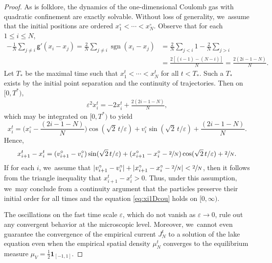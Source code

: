 \documentclass[JEP,XML,SOM,Unicode,published]{cedram}
\theoremstyle{plain}
\theoremstyle{definition}
\DeclareMathOperator{\sgn}{sgn}
\let\vep\varepsilon
\newcommand{\indic}{\mathbf{1}}
\newcommand{\g}{{\mathsf{g}}}
\begin{document}
\begin{proof}
As is folklore, the dynamics of the one-dimensional Coulomb gas with quadratic confinement are exactly solvable. Without loss of generality, we~assume that the initial positions are ordered $x_1^\circ<\cdots < x_N^\circ$. Observe that for each $1\le i\le N$,
\begin{align*}
- \frac1N\sum_{j\ne i}\g'(x_i-x_j) = \frac2N\sum_{j\neq i}\sgn(x_i-x_j) &= \frac2N\sum_{j<i} 1 - \frac2N\sum_{j>i}\\
&= \frac{2[(i-1) - (N-i)]}{N}= \frac{2(2i - 1-N)}{N}.
\end{align*}
Let $T_*$ be the maximal time such that $x_1^t<\cdots<x_N^t$ for all $t<T_*$. Such a $T_*$ exists by the initial point separation and the continuity of trajectories. Then on $[0,T^*)$,
\begin{align*}
\vep^2 \ddot{x}_i^t = - 2x_i^t + \frac{2(2i - 1-N)}{N},
\end{align*}
which may be integrated on $[0,T^*)$ to yield
\begin{equation}\label{eq:xi1Dcou}
x_i^t = \Big(x_i^\circ - \frac{(2i - 1-N)}{N}\Big)\cos(\sqrt{2}\,t/\vep) + v_i^\circ\sin(\sqrt{2}\,t/\vep) + \frac{(2i - 1-N)}{N}.
\end{equation}
Hence,
\begin{equation*}
x_{i+1}^t - x_i^t = (v_{i+1}^\circ - v_i^\circ)\sin(\sqrt{2}\,t/\vep) + (x_{i+1}^\circ-x_i^\circ - \sfrac{2}{N})\cos(\sqrt{2}\,t/\vep) + \sfrac{2}{N}.
\end{equation*}
If for each $i$, we~assume that $|v_{i+1}^\circ-v_i^\circ| + |x_{i+1}^\circ-x_i^\circ - \sfrac2N|< \sfrac2N$, then it follows from the triangle inequality that $x_{i+1}^t - x_i^t>0$. Thus, under this assumption, we~may conclude from a continuity argument that the particles preserve their initial order for all times and the equation \eqref{eq:xi1Dcou} holds on $[0,\infty)$.

The oscillations on the fast time scale $\vep$, which do not vanish as $\vep\to 0$, rule out any convergent behavior at the microscopic level. Moreover, we~cannot even guarantee the convergence of the empirical current $J_N^t$ to a solution of the lake equation even when the empirical spatial density $\mu_N^t$ converges to the equilibrium measure $\mu_V = \frac12\indic_{[-1,1]}$.


\end{proof}
\end{document}
